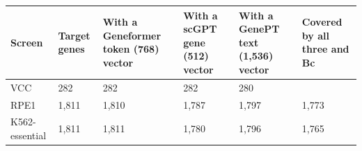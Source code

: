 \begin{tabular}{llllll}
\toprule
Screen & Target genes & With a Geneformer token (768) vector & With a scGPT gene (512) vector & With a GenePT text (1,536) vector & Covered by all three and Bc \\
\midrule
VCC & 282 & 282 & 282 & 280 &  \\
RPE1 & 1,811 & 1,810 & 1,787 & 1,797 & 1,773 \\
K562-essential & 1,811 & 1,811 & 1,780 & 1,796 & 1,765 \\
\bottomrule
\end{tabular}
